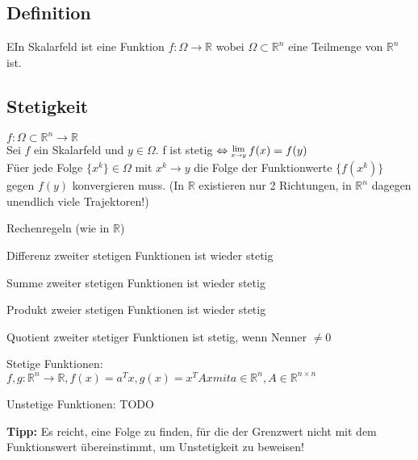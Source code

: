 \documentclass[german]{latex4ei/latex4ei_sheet}
\begin{document}
\begin{sectionbox}

	\subsection{Definition}
	EIn Skalarfeld ist eine Funktion $f:\Omega \rightarrow \mathbb{R}$ wobei $\Omega \subset \mathbb{R}^n$ eine Teilmenge von $\mathbb{R}^n$ ist.
\end{sectionbox}
\begin{sectionbox}	
	\subsection{Stetigkeit}
	$f: \Omega \subset \mathbb{R}^n \rightarrow \mathbb{R}$\\
	Sei $f$ ein Skalarfeld und $y \in \Omega$.
	f ist stetig $\Leftrightarrow \Lim{x \to y} f(x) = f(y)$\\
	F\"uer jede Folge $\{x^k\} \in \Omega$ mit $x^k \rightarrow y$ die Folge der Funktionwerte $\{f(x^k)\}$ gegen $f(y)$ konvergieren muss. (In $\mathbb{R}$ existieren nur 2 Richtungen, in $\mathbb{R}^n$ dagegen unendlich viele Trajektoren!)
	\begin{cookbox}{Rechenregeln (wie in $\mathbb{R}$)}
	\item Differenz zweiter stetigen Funktionen ist wieder stetig
	\item Summe zweiter stetigen Funktionen ist wieder stetig
	\item Produkt zweier stetigen Funktionen ist wieder stetig
	\item Quotient zweiter stetiger Funktionen ist stetig, wenn Nenner $\neq 0$ 
	\item Stetige Funktionen: $f,g: \mathbb{R}^n \rightarrow \mathbb{R}, f(x)=a^Tx, g(x)=x^T A x mit a \in \mathbb{R}^n, A \in \mathbb{R}^{n \times n}$
	\item Unstetige Funktionen: TODO
\end{cookbox}
\textbf{Tipp:} Es reicht, eine Folge zu finden, f\"ur die der Grenzwert nicht mit dem Funktionswert \"ubereinstimmt, um Unstetigkeit zu beweisen!
\end{sectionbox}
\end{document}
